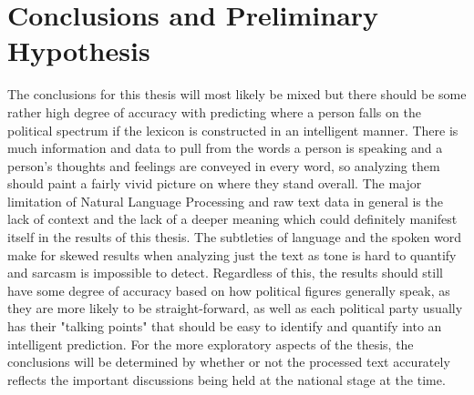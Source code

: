 \documentclass[reqno,12pt,oneside,letter]{report}
\begin{document}
\section*{Conclusions and Preliminary Hypothesis}
The conclusions for this thesis will most likely be mixed but there should be some rather high degree of accuracy with predicting where a person falls on the political spectrum if the lexicon is constructed in an intelligent manner.
There is much information and data to pull from the words a person is speaking and a person's thoughts and feelings are conveyed in every word, so analyzing them should paint a fairly vivid picture on where they stand overall.
The major limitation of Natural Language Processing and raw text data in general is the lack of context and the lack of a deeper meaning which could definitely manifest itself in the results of this thesis.
The subtleties of language and the spoken word make for skewed results when analyzing just the text as tone is hard to quantify and sarcasm is impossible to detect.
Regardless of this, the results should still have some degree of accuracy based on how political figures generally speak, as they are more likely to be straight-forward, as well as each political party usually has their "talking points" that should be easy to identify and quantify into an intelligent prediction.
For the more exploratory aspects of the thesis, the conclusions will be determined by whether or not the processed text accurately reflects the important discussions being held at the national stage at the time.

{


}
\end{document}
